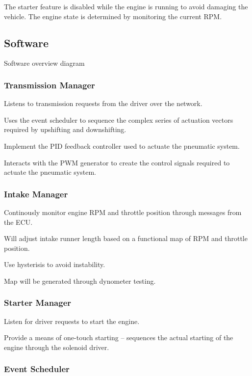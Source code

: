 The starter feature is disabled while the engine is running to avoid damaging the vehicle. The engine state is determined by monitoring the current RPM.

\subsection{Software}

Software overview diagram


\subsubsection{Transmission Manager}

Listens to transmission requests from the driver over the network.

Uses the event scheduler to sequence the complex series of actuation
vectors required by upshifting and downshifting.

Implement the PID feedback controller used to actuate the pneumatic
system.

Interacts with the PWM generator to create the control signals required
to actuate the pneumatic system.


\subsubsection{Intake Manager}

Continously monitor engine RPM and throttle position through messages
from the ECU.

Will adjust intake runner length based on a functional map of RPM
and throttle position.

Use hysterisis to avoid instability.

Map will be generated through dynometer testing.


\subsubsection{Starter Manager}

Listen for driver requests to start the engine.

Provide a means of one-touch starting -- sequences the actual starting
of the engine through the solenoid driver. 


\subsubsection{Event Scheduler}

